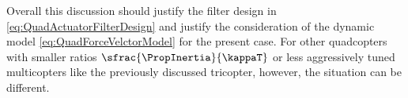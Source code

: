 Overall this discussion should justify the filter design in \eqref{eq:QuadActuatorFilterDesign} and justify the consideration of the dynamic model \eqref{eq:QuadForceVelctorModel} for the present case.
For other quadcopters with smaller ratios $\sfrac{\PropInertia}{\kappaT}$ or less aggressively tuned multicopters like the previously discussed tricopter, however, the situation can be different.


% 
% 
